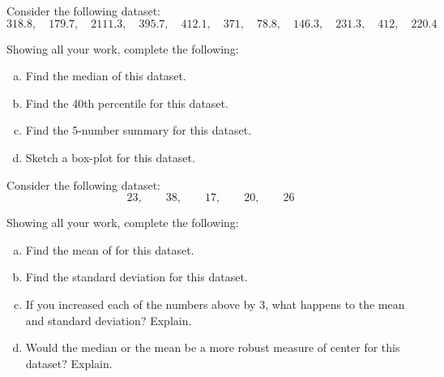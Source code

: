 \documentclass[11pt,letterpaper]{article}
\begin{document}

 Consider the following dataset:
	\[
	318.8, \quad 179.7, \quad 2111.3, \quad 395.7, \quad 412.1, \quad 371, \quad 78.8, \quad 146.3, \quad 231.3, \quad 412, \quad 220.4
	\]

Showing all your work, complete the following: 
        \begin{enumerate}[(a)]
        \item Find the median of this dataset. 
        \item Find the 40th percentile for this dataset. 
        \item Find the 5-number summary for this dataset. 
        \item Sketch a box-plot for this dataset. 
        \end{enumerate}



\newpage



 Consider the following dataset:
	\[
	23, \qquad 38, \qquad 17, \qquad 20, \qquad 26
	\]

Showing all your work, complete the following: 
	\begin{enumerate}[(a)]
	\item Find the mean of for this dataset. 
	\item Find the standard deviation for this dataset. 
	\item If you increased each of the numbers above by 3, what happens to the mean and standard deviation? Explain. 
	\item Would the median or the mean be a more robust measure of center for this dataset? Explain. 
	\end{enumerate}
\end{document}
